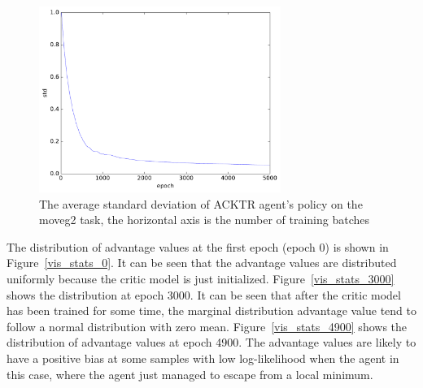 \begin{figure}[!htbp]
\label{key}	\includegraphics[width=0.7\textwidth]{images/rec_180528_std_statlog.pdf}
	\centering
	\caption{The average standard deviation of ACKTR agent's policy on the moveg2 task, the horizontal axis is the number of training batches}\label{rec_stat_moveg2_std}
\end{figure}
The distribution of advantage values at the first epoch (epoch 0) is shown in Figure~\ref{vis_stats_0}. It can be seen that the advantage values are distributed uniformly because the critic model is just initialized. Figure~\ref{vis_stats_3000} shows the distribution at epoch 3000. It can be seen that after the critic model has been trained for some time, the marginal distribution advantage value tend to follow a normal distribution with zero mean.  Figure~\ref{vis_stats_4900} shows the distribution of advantage values at epoch 4900. The advantage values are likely to have a positive bias at some samples with low log-likelihood  when the agent in this case, where the agent just managed to escape from a local minimum.  


